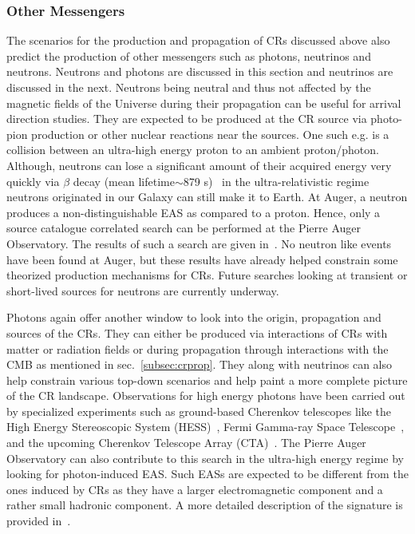 \subsubsection*{Other Messengers}
\label{subsubsec:CRmessengers}
The scenarios for the production and propagation of CRs discussed above also predict the production of other messengers such as photons, neutrinos and neutrons. Neutrons and photons are discussed in this section and neutrinos are discussed in the next. 
Neutrons being neutral and thus not affected by the magnetic fields of the Universe during their propagation can be useful for arrival direction studies. They are expected to be produced at the CR source via photo-pion production or other nuclear reactions near the sources. One such e.g. is a collision between an ultra-high energy proton to an ambient proton/photon. Although, neutrons can lose a significant amount of their acquired energy very quickly via $\beta$ decay (mean lifetime$\sim$879 s)~\cite{ParticleDataGroup:2024cfk} in the ultra-relativistic regime neutrons originated in our Galaxy can still make it to Earth. At Auger, a neutron produces a non-distinguishable EAS as compared to a proton. Hence, only a source catalogue correlated search can be performed at the Pierre Auger Observatory. The results of such a search are given in~\cite{PierreAuger:2023onx}. No neutron like events have been found at Auger, but these results have already helped constrain some theorized production mechanisms for CRs. Future searches looking at transient or short-lived sources for neutrons are currently underway. 

Photons again offer another window to look into the origin, propagation and sources of the CRs. They can either be produced via interactions of CRs with matter or radiation fields or during propagation through interactions with the CMB as mentioned in sec.~\ref{subsec:crprop}. They along with neutrinos can also help constrain various top-down scenarios and help paint a more complete picture of the CR landscape. Observations for high energy photons have been carried out by specialized experiments such as ground-based Cherenkov telescopes like the High Energy Stereoscopic System (HESS)~\cite{Puhlhofer:2024fjx}, Fermi Gamma-ray Space Telescope~\cite{Thompson_2022}, and the upcoming Cherenkov Telescope Array (CTA)~\cite{2018_CTAO}. The Pierre Auger Observatory can also contribute to this search in the ultra-high energy regime by looking for photon-induced EAS. Such EASs are expected to be different from the ones induced by CRs as they have a larger electromagnetic component and a rather small hadronic component. A more detailed description of the signature is provided in~\cite{universe8110579}. 

